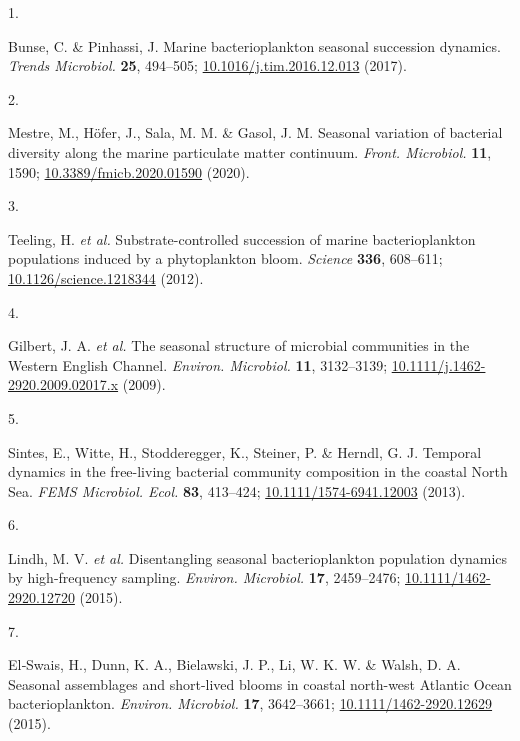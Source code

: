 \documentclass[
  12pt,
]{article}
\newlength{\cslhangindent}
\newlength{\csllabelwidth}
\newlength{\cslentryspacingunit} %
\newenvironment{CSLReferences}[2] %
 {%
  \setlength{\parindent}{0pt}
  \ifodd #1
  \let\oldpar\par
  \def\par{\hangindent=\cslhangindent\oldpar}
  \fi
  \setlength{\parskip}{#2\cslentryspacingunit}
 }%
 {}
\newcommand{\CSLLeftMargin}[1]{\parbox[t]{\csllabelwidth}{#1}}
\newcommand{\CSLRightInline}[1]{\parbox[t]{\linewidth - \csllabelwidth}{#1}\break}
\begin{document}
\hypertarget{refs}{}
\begin{CSLReferences}{0}{0}
\leavevmode{}%
\CSLLeftMargin{1. }
\CSLRightInline{Bunse, C. \& Pinhassi, J. Marine bacterioplankton
seasonal succession dynamics. \emph{Trends Microbiol.} \textbf{25},
494--505;
\href{https://doi.org/10.1016/j.tim.2016.12.013}{10.1016/j.tim.2016.12.013}
(2017).}

\leavevmode{}%
\CSLLeftMargin{2. }
\CSLRightInline{Mestre, M., Höfer, J., Sala, M. M. \& Gasol, J. M.
Seasonal variation of bacterial diversity along the marine particulate
matter continuum. \emph{Front. Microbiol.} \textbf{11}, 1590;
\href{https://doi.org/10.3389/fmicb.2020.01590}{10.3389/fmicb.2020.01590}
(2020).}

\leavevmode{}%
\CSLLeftMargin{3. }
\CSLRightInline{Teeling, H. \emph{et al.} Substrate-controlled
succession of marine bacterioplankton populations induced by a
phytoplankton bloom. \emph{Science} \textbf{336}, 608--611;
\href{https://doi.org/10.1126/science.1218344}{10.1126/science.1218344}
(2012).}

\leavevmode{}%
\CSLLeftMargin{4. }
\CSLRightInline{Gilbert, J. A. \emph{et al.} The seasonal structure of
microbial communities in the {Western English Channel}. \emph{Environ.
Microbiol.} \textbf{11}, 3132--3139;
\href{https://doi.org/10.1111/j.1462-2920.2009.02017.x}{10.1111/j.1462-2920.2009.02017.x}
(2009).}

\leavevmode{}%
\CSLLeftMargin{5. }
\CSLRightInline{Sintes, E., Witte, H., Stodderegger, K., Steiner, P. \&
Herndl, G. J. Temporal dynamics in the free-living bacterial community
composition in the coastal {North Sea}. \emph{FEMS Microbiol. Ecol.}
\textbf{83}, 413--424;
\href{https://doi.org/10.1111/1574-6941.12003}{10.1111/1574-6941.12003}
(2013).}

\leavevmode{}%
\CSLLeftMargin{6. }
\CSLRightInline{Lindh, M. V. \emph{et al.} Disentangling seasonal
bacterioplankton population dynamics by high-frequency sampling.
\emph{Environ. Microbiol.} \textbf{17}, 2459--2476;
\href{https://doi.org/10.1111/1462-2920.12720}{10.1111/1462-2920.12720}
(2015).}

\leavevmode{}%
\CSLLeftMargin{7. }
\CSLRightInline{El‐Swais, H., Dunn, K. A., Bielawski, J. P., Li, W. K.
W. \& Walsh, D. A. Seasonal assemblages and short-lived blooms in
coastal north-west {Atlantic Ocean} bacterioplankton. \emph{Environ.
Microbiol.} \textbf{17}, 3642--3661;
\href{https://doi.org/10.1111/1462-2920.12629}{10.1111/1462-2920.12629}
(2015).}


\end{CSLReferences}
\end{document}

